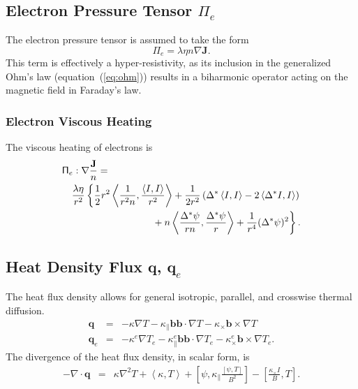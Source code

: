 \documentclass[letterpaper]{book}
\renewcommand{\vec}[1]{\ensuremath{\mathbf{#1}}}
\newcommand{\tensor}[1]{\mathsf{#1}}
\renewcommand{\j}{\vec{J}}
\newcommand{\q}{\vec{q}}
\renewcommand{\P}{\tensor{\Pi}}
\renewcommand{\b}{\vec{b}}
\newcommand{\grad}[1]{\nabla #1}
\renewcommand{\div}[1]{\nabla \cdot #1}
\newcommand{\dotdot}{:}
\newcommand{\gs}[1]{\Delta^* #1}
\newcommand{\lp}[1]{\nabla^2 #1}
\newcommand{\pb}[2]{\left[#1,#2\right]}
\newcommand{\ip}[2]{\left\langle  #1,#2\right\rangle}
\begin{document}
\subsection{Electron Pressure Tensor $\P_e$ 
  \label{sec:electron_pressure_tensor}}

The electron pressure tensor is assumed to take the form
\begin{equation}
  \label{eq:electron_pressure_tensor}
  \P_e = \lambda \eta n \grad{\j}.
\end{equation}
This term is effectively a hyper-resistivity, as its inclusion in the
generalized Ohm's law (equation~(\ref{eq:ohm})) results in a
biharmonic operator acting on the magnetic field in Faraday's law.  

\subsubsection{Electron Viscous Heating}

The viscous heating of electrons is
\begin{eqnarray}
  \lefteqn{\P_e \dotdot \grad{\frac{\j}{n}} = }
  \\ & &
  \frac{\lambda \eta}{r^2} \left\{ 
  \frac{1}{2}r^2 \ip{\frac{1}{r^2 n}}{\frac{\ip{I}{I}}{r^2}}
  + \frac{1}{2 r^2} \left( \gs{\ip{I}{I}} - 2 \ip{\gs{I}}{I} \right)
  \nonumber \right. \\ & & \left. \mbox{}
  + n \ip{\frac{\gs{\psi}}{r n}}{\frac{\gs{\psi}}{r}}
  + \frac{1}{r^4} (\gs{\psi})^2 \right\}.
\end{eqnarray}


\subsection{Heat Density Flux $\q$, $\q_e$}
\label{sec:heat_flux}

The heat flux density allows for general isotropic, parallel, and
crosswise thermal diffusion.
\begin{eqnarray}
  \label{eq:heat_flux}
  \q & = & -\kappa \grad{T} - \kappa_\parallel \b \b \cdot \grad{T} 
  - \kappa_\times \b \times \grad{T} \\
  \q_e & = & -\kappa^e \grad{T_e} - \kappa_\parallel^e \b \b \cdot \grad{T_e}
  - \kappa_\times^e \b \times \grad{T_e}.
\end{eqnarray}
The divergence of the heat flux density, in scalar form, is
\begin{eqnarray}
  -\div \q & = & \kappa \lp{T} + \ip{\kappa}{T} 
  + \pb{\psi}{\kappa_\parallel \frac{\pb{\psi}{T}}{B^2}}
  - \pb{\frac{\kappa_\times I}{B}}{T}.
\end{eqnarray}
\end{document}
